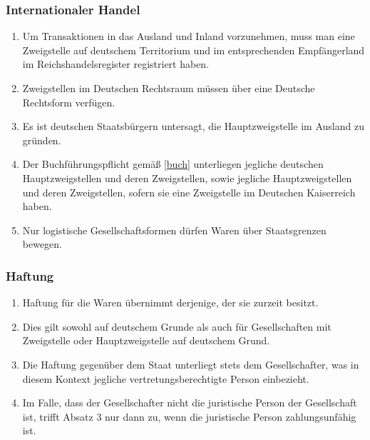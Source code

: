 \documentclass{article}
\begin{document}
\subsubsection{Internationaler Handel}
\begin{enumerate}[(1)]
    \item Um Transaktionen in das Ausland und Inland vorzunehmen, muss man eine Zweigstelle auf deutschem Territorium und im entsprechenden Empfängerland im Reichshandelsregister registriert haben.
    \item Zweigstellen im Deutschen Rechtsraum müssen über eine Deutsche Rechtsform verfügen.
    \item Es ist deutschen Staatsbürgern untersagt, die Hauptzweigstelle im Ausland zu gründen.
    \item Der Buchführungspflicht gemäß \ref{buch} unterliegen jegliche deutschen Hauptzweigstellen und deren Zweigstellen, sowie jegliche Hauptzweigstellen und deren Zweigstellen, sofern sie eine Zweigstelle im Deutschen Kaiserreich haben.
    \item Nur logistische Gesellschaftsformen dürfen Waren über Staatsgrenzen bewegen.
\end{enumerate}

\subsubsection{Haftung}
\begin{enumerate}[(1)]
    \item Haftung für die Waren übernimmt derjenige, der sie zurzeit besitzt.
    \item Dies gilt sowohl auf deutschem Grunde als auch für Gesellschaften mit Zweigstelle oder Hauptzweigstelle auf deutschem Grund.
    \item Die Haftung gegenüber dem Staat unterliegt stets dem Gesellschafter, was in diesem Kontext jegliche vertretungsberechtigte Person einbezieht.
    \item Im Falle, dass der Gesellschafter nicht die juristische Person der Gesellschaft ist, trifft Absatz 3 nur dann zu, wenn die juristische Person zahlungsunfähig ist.
\end{enumerate}
\end{document}
